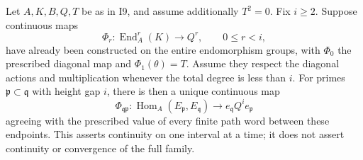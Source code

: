 \begin{proposition}
Let $A,K,B,Q,T$ be as in I9, and assume additionally $T^2=0$.
Fix $i\geq2$. Suppose continuous maps
\[
 \Phi_r:\operatorname{End}_A^r(K)\longrightarrow Q^r,
 \qquad 0\leq r<i,
\]
have already been constructed on the entire endomorphism groups,
with $\Phi_0$ the prescribed diagonal map and $\Phi_1(\theta)=T$.
Assume they respect the diagonal actions and multiplication whenever
the total degree is less than $i$. For primes
$\mathfrak p\subset\mathfrak q$ with height gap $i$, there is then
a unique continuous map
\[
 \Phi_{\mathfrak q\mathfrak p}:
   \operatorname{Hom}_A(E_{\mathfrak p},E_{\mathfrak q})
           \longrightarrow e_{\mathfrak q}Q^i e_{\mathfrak p}
\]
agreeing with the prescribed value of every finite path word between
these endpoints. This asserts continuity on one interval at a time;
it does not assert continuity or convergence of the full family.
\end{proposition}
